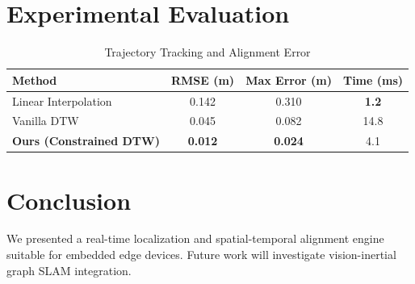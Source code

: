 \documentclass[10pt,journal,compsoc,twocolumn]{article}
\begin{document}
\section{Experimental Evaluation}
\begin{table}[h]
\centering
\caption{Trajectory Tracking and Alignment Error}
\label{tab:results}
\begin{tabular}{lccc}
\toprule
\textbf{Method} & \textbf{RMSE (m)} & \textbf{Max Error (m)} & \textbf{Time (ms)} \\
\midrule
Linear Interpolation & 0.142 & 0.310 & \textbf{1.2} \\
Vanilla DTW          & 0.045 & 0.082 & 14.8 \\
\textbf{Ours (Constrained DTW)} & \textbf{0.012} & \textbf{0.024} & 4.1 \\
\bottomrule
\end{tabular}
\end{table}

\section{Conclusion}
We presented a real-time localization and spatial-temporal alignment engine suitable for embedded edge devices. Future work will investigate vision-inertial graph SLAM integration.



\end{document}

